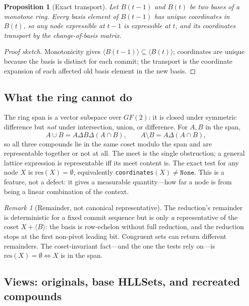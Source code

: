 \documentclass[11pt,a4paper]{article}
\newtheorem{proposition}[principle]{Proposition}
\theoremstyle{remark}
\newtheorem{remark}[principle]{Remark}
\newcommand{\xor}{\ensuremath{\Delta}}                %
\newcommand{\res}{\ensuremath{\mathrm{res}}}          %
\newcommand{\spanof}[1]{\ensuremath{\langle #1\rangle}} %
\begin{document}
\begin{proposition}[Exact transport]
\label{prop:transport}
Let $B(t{-}1)$ and $B(t)$ be two bases of a monotone ring. Every basis element
of $B(t{-}1)$ has unique coordinates in $B(t)$, so any node expressible at
$t{-}1$ is expressible at $t$, and its coordinates transport by the
change-of-basis matrix.
\end{proposition}
\begin{proof}[Proof sketch]
Monotonicity gives $\spanof{B(t{-}1)}\subseteq\spanof{B(t)}$; coordinates are
unique because the basis is distinct for each commit; the transport is the
coordinate expansion of each affected old basis element in the new basis.
\end{proof}

\subsection{What the ring cannot do}

The ring span is a vector subspace over $GF(2)$: it is closed under symmetric
difference but \emph{not} under intersection, union, or difference. For
$A,B$ in the span,
\[
A\cup B = A\xor B\xor(A\cap B),
\qquad
A\setminus B = A\xor(A\cap B),
\]
so all three compounds lie in the same coset modulo the span and are
representable together or not at all. The meet is the single obstruction; a
general lattice expression is representable iff its meet content is. The exact
test for any node $X$ is $\res(X)=\emptyset$, equivalently
\texttt{coordinates}$(X)\neq\texttt{None}$. This is a feature, not a defect: it
gives a measurable quantity---how far a node is from being a linear combination
of the context.

\begin{remark}[Remainder, not canonical representative]
The reduction's remainder is deterministic for a fixed commit sequence but
is only \emph{a} representative of the coset $X+\spanof{B}$: the basis is
row-echelon without full reduction, and the reduction stops at the first
non-pivot leading bit. Congruent sets can return different remainders. The
coset-invariant fact---and the one the tests rely on---is
$\res(X)=\emptyset \Leftrightarrow X$ is in the span.
\end{remark}

\subsection{Views: originals, base HLLSets, and recreated compounds}
\label{sec:views}
\end{document}
